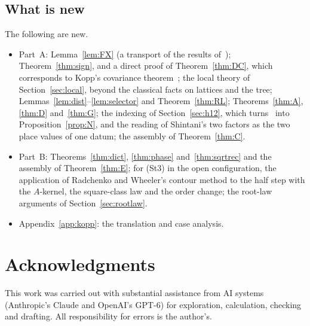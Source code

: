 \documentclass[11pt]{amsart}
\numberwithin{equation}{section}
\theoremstyle{plain}
\theoremstyle{definition}
\theoremstyle{remark}
\begin{document}
\subsection*{What is new}
The following are new.
\begin{itemize}
\item Part~A: Lemma~\ref{lem:FX} (a transport of the results of~\cite{RW}); Theorem~\ref{thm:sign}, and a direct proof of Theorem~\ref{thm:DC}, which corresponds to Kopp's covariance theorem~\cite[Thm.~4.37]{Ko}; the local theory of Section~\ref{sec:local}, beyond the classical facts on lattices and the tree; Lemmas~\ref{lem:dist}--\ref{lem:selector} and Theorem~\ref{thm:RL}; Theorems~\ref{thm:A}, \ref{thm:D} and~\ref{thm:G}; the indexing of Section~\ref{sec:h12}, which turns~\cite[Cor.~5.2.5(1)]{Ya08} into Proposition~\ref{prop:N}, and the reading of Shintani's two factors as the two place values of one datum; the assembly of Theorem~\ref{thm:C}.
\item Part~B: Theorems~\ref{thm:dict}, \ref{thm:phase} and~\ref{thm:sqrtrec} and the assembly of Theorem~\ref{thm:E}; for (St3) in the open configuration, the application of Radchenko and Wheeler's contour method to the half step with the $A$-kernel, the square-class law and the order change; the root-law arguments of Section~\ref{sec:rootlaw}.
\item Appendix~\ref{app:kopp}: the translation and case analysis.
\end{itemize}

\section*{Acknowledgments}
This work was carried out with substantial assistance from AI systems (Anthropic's Claude and OpenAI's GPT-6) for exploration, calculation, checking and drafting. All responsibility for errors is the author's.
\end{document}
